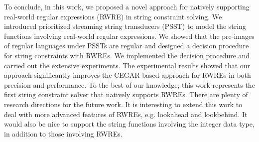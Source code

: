 To conclude, in this work, we proposed a novel approach for natively supporting real-world regular expressions (RWRE) in string constraint solving. We introduced prioritized streaming string transducers (PSST) to  model the string functions involving real-world regular expressions. We showed that the pre-images of regular languages under PSSTs are regular and designed a decision procedure for string constraints with RWREs. We implemented the decision procedure and carried out the extensive experiments. The experimental results showed that our approach significantly improves the CEGAR-based approach for RWREs in both precision and performance. To the best of our knowledge, this work represents the first string constraint solver that natively supports RWREs. There are plenty of research directions for the future work. It is interesting to extend this work to deal with more advanced features of RWREs, e.g. lookahead and lookbehind. It would also be nice to support the string functions involving the integer data type, in addition to those involving RWREs.
